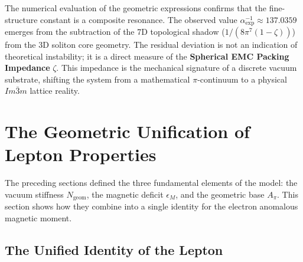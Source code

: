 \documentclass[10pt,a4paper]{article}
\begin{document}
\vspace{5mm}
\begin{center}
\end{center}

\noindent The numerical evaluation of the geometric expressions confirms that the fine-structure constant is a composite resonance. The observed value \(\alpha_{\text{exp}}^{-1} \approx 137.0359\) emerges from the subtraction of the 7D topological shadow (\(1/(8\pi^7(1-\zeta))\)) from the 3D soliton core geometry. The residual deviation is not an indication of theoretical instability; it is a direct measure of the \textbf{Spherical EMC Packing Impedance} \(\zeta\). This impedance is the mechanical signature of a discrete vacuum substrate, shifting the system from a mathematical \(\pi\)-continuum to a physical \(Im\bar{3}m\) lattice reality.

\section{The Geometric Unification of Lepton Properties}
\label{sec:geometric_unification}

The preceding sections defined the three fundamental elements of the model:
the vacuum stiffness \(N_{\text{geom}}\),
the magnetic deficit \(\epsilon_M\),
and the geometric base \(A_\pi\).
This section shows how they combine into a single identity for the electron
anomalous magnetic moment.

\subsection{The Unified Identity of the Lepton}
\label{sec:unified_identity}
\end{document}
